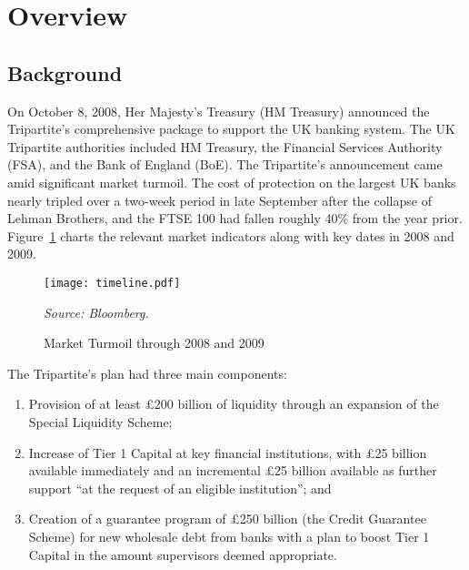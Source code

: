 \documentclass[12pt]{article}
\begin{document}
\section{Overview}

\subsection{Background}

On October 8, 2008, Her Majesty's Treasury (HM Treasury) announced the Tripartite's comprehensive package to support the UK banking system. The UK Tripartite authorities included HM Treasury, the Financial Services Authority (FSA), and the Bank of England (BoE). The Tripartite's announcement came amid significant market turmoil. The cost of protection on the largest UK banks nearly tripled over a two-week period in late September after the collapse of Lehman Brothers, and the FTSE 100 had fallen roughly 40\% from the year prior. Figure~\ref{timeline} charts the relevant market indicators along with key dates in 2008 and 2009.

\begin{figure}[h]
\caption{Market Turmoil through 2008 and 2009}\label{timeline}
\centering
\texttt{[image: timeline.pdf]}
\raggedright
\textit{\footnotesize Source: Bloomberg.}
\end{figure}

The Tripartite's plan had three main components:

\begin{enumerate}
\item Provision of at least \pounds 200 billion of liquidity through an expansion of the Special Liquidity Scheme;
\item Increase of Tier 1 Capital at key financial institutions, with \pounds 25 billion available immediately and an incremental \pounds 25 billion available as further support ``at the request of an eligible institution''; and
\item Creation of a guarantee program of \pounds 250 billion (the Credit Guarantee Scheme) for new wholesale debt from banks with a plan to boost Tier 1 Capital in the amount supervisors deemed appropriate.
\end{enumerate}
\end{document}
